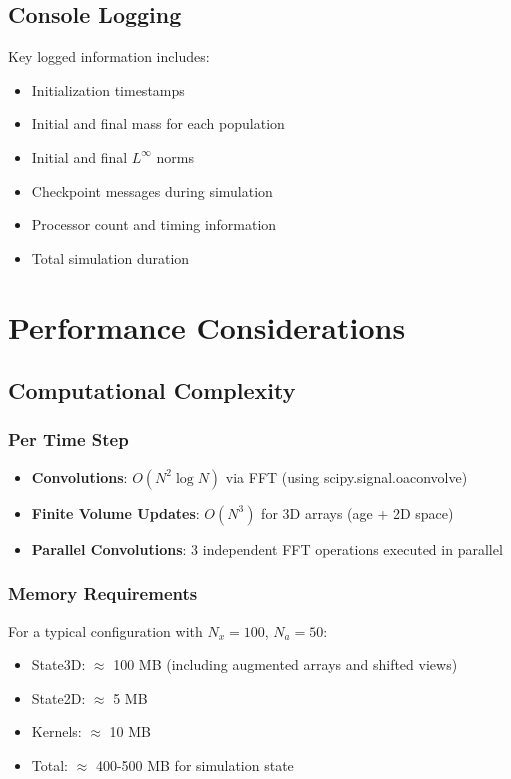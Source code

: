 \documentclass[12pt,a4paper]{report}
\begin{document}
\section{Console Logging}

Key logged information includes:

\begin{itemize}
    \item Initialization timestamps
    \item Initial and final mass for each population
    \item Initial and final $L^\infty$ norms
    \item Checkpoint messages during simulation
    \item Processor count and timing information
    \item Total simulation duration
\end{itemize}

\chapter{Performance Considerations}

\section{Computational Complexity}

\subsection{Per Time Step}

\begin{itemize}
    \item \textbf{Convolutions}: $O(N^2 \log N)$ via FFT (using scipy.signal.oaconvolve)
    \item \textbf{Finite Volume Updates}: $O(N^3)$ for 3D arrays (age + 2D space)
    \item \textbf{Parallel Convolutions}: 3 independent FFT operations executed in parallel
\end{itemize}

\subsection{Memory Requirements}

For a typical configuration with $N_x = 100$, $N_a = 50$:

\begin{itemize}
    \item State3D: $\approx$ 100 MB (including augmented arrays and shifted views)
    \item State2D: $\approx$ 5 MB
    \item Kernels: $\approx$ 10 MB
    \item Total: $\approx$ 400-500 MB for simulation state
\end{itemize}
\end{document}

